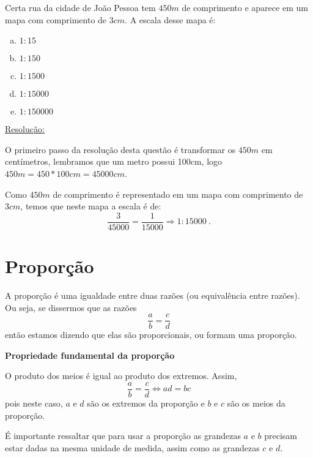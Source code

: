 \begin{exem}[FGV - 2014]
Certa rua da cidade de João Pessoa tem $450 m$ de comprimento e aparece em um mapa com comprimento de $3 cm$. A escala desse mapa é:
\begin{multicols}{5}
\begin{enumerate}[a)]
 \item $1:15$
 \item $1:150$
 \item $1:1500$
 \item $1:15000$
 \item $1:150000$
\end{enumerate}
\end{multicols}
\underline{Resolução:}

O primeiro passo da resolução desta questão é transformar os $450m$ em centímetros, lembramos que um metro possui 100cm, logo $450 m=450*100 cm= 45000 cm$.

Como $450 m$ de comprimento é representado em um mapa com comprimento de $3 cm$, temos que neste mapa a escala é de:
\[\frac{3}{45000}= \frac{1}{15000} \Rightarrow 1:15000 \ .\]

 \fim
\end{exem}


\section{Proporção}

A proporção é uma igualdade entre duas razões (ou equivalência entre razões). Ou seja, se dissermos que as razões
\[\frac{a}{b}= \frac{c}{d}\]
então estamos dizendo que elas são proporcionais, ou formam uma proporção.

\vskip0.3cm

\colorbox{azul}{
 \begin{minipage}{14.5cm}
 \begin{center}
 \textbf{Propriedade fundamental da proporção}

   O produto dos meios é igual ao produto dos extremos. Assim,
 \[\frac{a}{b}= \frac{c}{d} \Leftrightarrow ad= bc\]
 pois neste caso, $a$ e $d$ são os extremos da proporção e $b$ e $c$ são os meios da proporção.
 \end{center}
 \end{minipage}}

 \vskip0.3cm

É importante ressaltar que para usar a proporção as grandezas $a$ e $b$ precisam estar dadas na mesma unidade de medida, assim como as grandezas $c$ e $d$.


